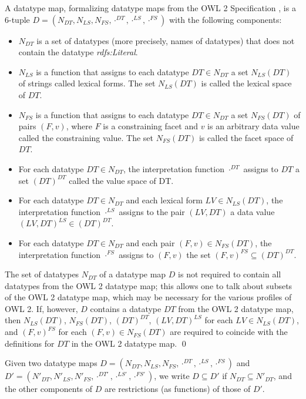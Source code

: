 \documentclass[10pt,fleqn,final]{scrreprt}
\newenvironment{definitions}[0]{\medskip }{}
\begin{document}
\begin{definitions}
\begin{definition}
A datatype map, formalizing datatype maps from the OWL 2 Specification \cite{w3c:owl2-spec}, is a 6-tuple $D = ( N_{DT} , N_{LS} , N_{FS} , \cdot^{DT} , \cdot^{LS} , \cdot^{FS} )$ with the following components:
\begin{itemize}
\item
    $N_{DT}$ is a set of datatypes (more precisely, names of datatypes) that does not contain the datatype \textit{rdfs:Literal}.
\item
    $N_{LS}$ is a function that assigns to each datatype $DT \in N_{DT}$ a set $N_{LS}(DT)$ of strings called lexical forms. The set $N_{LS}(DT)$ is called the lexical space of $DT$.
\item
    $N_{FS}$ is a function that assigns to each datatype $DT \in N_{DT}$ a set $N_{FS}(DT)$ of pairs $( F , v )$, where $F$ is a constraining facet and $v$ is an arbitrary data value called the constraining value. The set $N_{FS}(DT)$ is called the facet space of $DT$.
\item
    For each datatype $DT \in N_{DT}$, the interpretation function $\cdot^{DT}$ assigns to $DT$ a set $(DT)^{DT}$ called the value space of DT.
\item
    For each datatype $DT \in N_{DT}$ and each lexical form $LV \in N_{LS}(DT)$, the interpretation function $\cdot^{LS}$ assigns to the pair $( LV , DT )$ a data value $( LV , DT )^{LS} \in (DT)^{DT}$.
\item
    For each datatype $DT \in N_{DT}$ and each pair $( F , v ) \in N_{FS}(DT)$, the interpretation function $\cdot^{FS}$ assigns to $( F , v )$ the set $( F , v )^{FS}\subseteq(DT)^{DT}$. 
\end{itemize}

The set of datatypes $N_{DT}$ of a datatype map $D$ is not required to contain all datatypes from the OWL 2 datatype map; this allows one to talk about subsets of the OWL 2 datatype map, which may be necessary for the various profiles of OWL 2. If, however, $D$ contains a datatype $DT$ from the OWL 2 datatype map, then $N_{LS}(DT)$, $N_{FS}(DT)$, $(DT)^{DT}$, $( LV , DT )^{LS}$ for each $LV \in N_{LS}(DT)$, and $( F , v )^{FS}$ for each $( F , v ) \in N_{FS}(DT)$ are required to coincide with the definitions for $DT$ in the OWL 2 datatype map.
\qed\end{definition}

Given two datatype maps $D = ( N_{DT} , N_{LS} , N_{FS} , \cdot^{DT} , \cdot^{LS} , \cdot^{FS} )$ and $D' = ( N'_{DT} , N'_{LS} , N'_{FS} , \cdot^{DT'} , \cdot^{LS'} , \cdot^{FS'} )$, we write $D\subseteq D'$ if $N_{DT}\subseteq N'_{DT}$, and
the other components of $D$ are restrictions (as functions) of those of $D'$.


\end{definitions}
\end{document}

